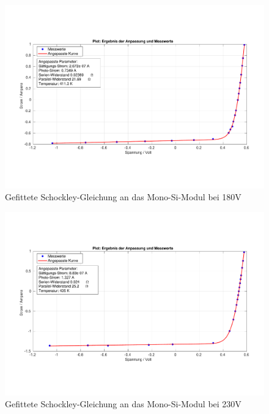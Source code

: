 \begin{figure}[ht]
    \centering
    \includegraphics[width = \linewidth]{Bilder/SiMono180Plot.pdf}
    \caption{Gefittete Schockley-Gleichung an das Mono-Si-Modul bei 180V}
\end{figure}


\begin{figure}[ht]
    \centering
    \includegraphics[width = \linewidth]{Bilder/SiMono230Plot.pdf}
    \caption{Gefittete Schockley-Gleichung an das Mono-Si-Modul bei 230V}
\end{figure}


